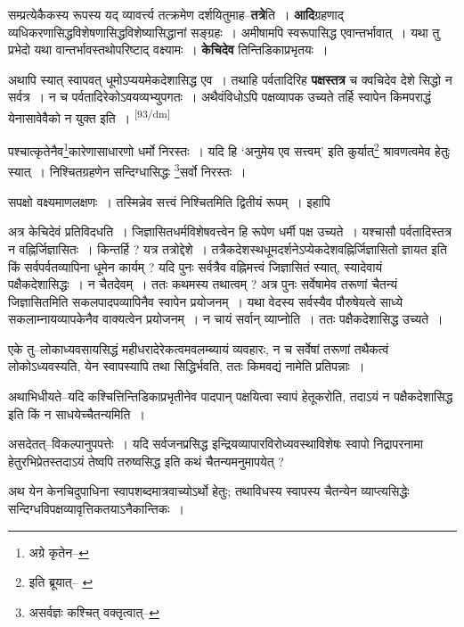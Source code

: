 \documentclass[article,12pt,a4paper]{memoir}
\begin{document}
	  \pstart सम्प्रत्येकैकस्य रूपस्य यद् व्यावर्त्त्य तत्क्रमेण दर्शयितुमाह--\textbf{तत्रे}ति । \textbf{आदि}ग्रहणाद् व्यधिकरणासिद्धविशेषणासिद्धविशेष्यासिद्धानां सङ्ग्रहः । अमीषामपि स्वरूपासिद्ध एवान्तर्भावात् । यथा तु प्रभेदो यथा वान्तर्भावस्तथोपरिष्टाद् वक्ष्यामः । \textbf{केचिदेव} तिन्तिडिकाप्रभृतयः ।
	\pend
      

	  \pstart अथापि स्यात् स्वापवत् धूमोऽप्ययमेकदेशासिद्ध एव । तथाहि पर्वतादिरिह \textbf{पक्षस्तत्र} च क्वचिदेव देशे सिद्धो न सर्वत्र । न च पर्वतादिरेकोऽवयव्यभ्युपगतः । अथैवंविधोऽपि पक्षव्यापक उच्यते तर्हि स्वापेन किमपराद्धं येनासावेवैको न युक्त इति ।
	\pend
      \leavevmode\textsuperscript{\rmlatinfont\tiny [93/dm]}

	  \pstart पश्चात्कृतेनैव\footnote{अग्रे कृतेन--\cite{dp-msD-n}}कारेणासाधारणो धर्मो निरस्तः । यदि हि ‘अनुमेय एव सत्त्वम्’ इति कुर्यात्\footnote{इति ब्रूयात्--\cite{dp-msB} \cite{dp-msD}} श्रावणत्वमेव हेतुः स्यात् । निश्चितग्रहणेन सन्दिग्धासिद्धः \footnote{असर्वज्ञः कश्चित् वक्तृत्वात्--\cite{dp-msD-n}}सर्वो निरस्तः ।
	\pend
       

	  \pstart सपक्षो वक्ष्यमाणलक्षणः । तस्मिन्नेव सत्त्वं निश्चितमिति द्वितीयं रूपम् । इहापि
	\pend
      

	  \pstart अत्र केचिदेवं प्रतिविदधति । जिज्ञासितधर्मविशेषवत्त्वेन हि रूपेण धर्मी पक्ष उच्यते । यश्चासौ पर्वतादिस्तत्र न वह्निर्जिज्ञासितः । किन्तर्हि ? यत्र तत्रोद्देशे । तत्रैकदेशस्थधूमदर्शनेऽप्येकदेशवह्निर्जिज्ञासितो ज्ञायत इति किं सर्वपर्वतव्यापिना धूमेन कार्यम् ? यदि पुनः सर्वत्रैव वह्निमत्त्वं जिज्ञासितं स्यात्, स्यादेवायं पक्षैकदेशासिद्धः । न चैतदेवम् । ततः कथमस्य तथात्वम् ? अत्र पुनः सर्वेषामेव तरूणां चैतन्यं जिज्ञासितमिति सकलपादपव्यापिनैव स्वापेन प्रयोजनम् । यथा वेदस्य सर्वस्यैव पौरुषेयत्वे साध्ये सकलाम्नायव्यापकेनैव वाक्यत्वेन प्रयोजनम् । न चायं सर्वान् व्याप्नोति । ततः पक्षैकदेशासिद्ध उच्यते ।
	\pend
      

	  \pstart एके तु--लोकाध्यवसायसिद्धं महीधरादेरेकत्वमवलम्ब्यायं व्यवहारः, न च सर्वेषां तरूणां तथैकत्वं लोकोऽध्यवस्यति, येन स्वापस्यापि तथा सिद्धिर्भवति, ततः किमवद्यं नामेति प्रतिपन्नाः ।
	\pend
      

	  \pstart अथाभिधीयते--यदि कश्चित्तिन्तिडिकाप्रभृतीनेव पादपान् पक्षयित्वा स्वापं हेतूकरोति, तदाऽयं न पक्षैकदेशासिद्ध इति किं न साधयेच्चैतन्यमिति ।
	\pend
      

	  \pstart असदेतत्--विकल्पानुपपत्तेः । यदि सर्वजनप्रसिद्ध इन्द्रियव्यापारविरोध्यवस्थाविशेषः स्वापो निद्रापरनामा हेतुरभिप्रेतस्तदाऽयं तेष्वपि तरुष्वसिद्ध इति कथं चैतन्यमनुमापयेत् ?
	\pend
      

	  \pstart अथ येन केनचिदुपाधिना स्वापशब्दमात्रवाच्योऽर्थो हेतुः; तथाविधस्य स्वापस्य चैतन्येन व्याप्त्यसिद्धेः सन्दिग्धविपक्षव्यावृत्तिकतयाऽनैकान्तिकः ।
	\pend
      
\end{document}
